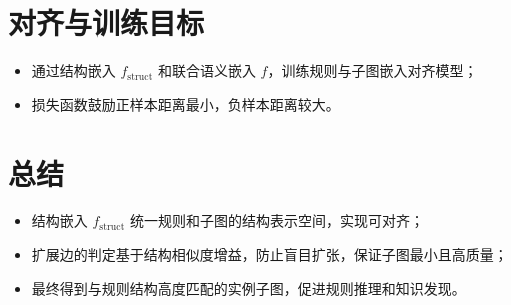 \documentclass{article}
\begin{document}
\section{对齐与训练目标}
\begin{itemize}
    \item 通过结构嵌入 $f_{\text{struct}}$ 和联合语义嵌入 $f$，训练规则与子图嵌入对齐模型；
    \item 损失函数鼓励正样本距离最小，负样本距离较大。
\end{itemize}

\section{总结}
\begin{itemize}
    \item 结构嵌入 $f_{\text{struct}}$ 统一规则和子图的结构表示空间，实现可对齐；
    \item 扩展边的判定基于结构相似度增益，防止盲目扩张，保证子图最小且高质量；
    \item 最终得到与规则结构高度匹配的实例子图，促进规则推理和知识发现。
\end{itemize}

\newpage %
\end{document}
